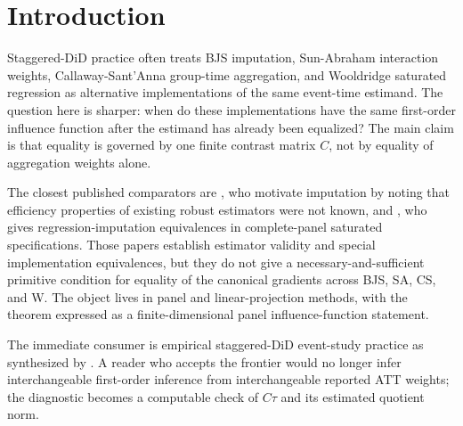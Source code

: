 \documentclass[11pt]{article}
\theoremstyle{definition}
\theoremstyle{plain}
\theoremstyle{remark}
\begin{document}
\section{Introduction}
Staggered-DiD practice often treats BJS imputation, Sun-Abraham interaction weights, Callaway-Sant'Anna group-time aggregation, and Wooldridge saturated regression as alternative implementations of the same event-time estimand. The question here is sharper: when do these implementations have the same first-order influence function after the estimand has already been equalized? The main claim is that equality is governed by one finite contrast matrix \(C\), not by equality of aggregation weights alone.

The closest published comparators are \citet[p.~949, Sec.~1]{borusyak_jaravel_spiess_2024_restud}, who motivate imputation by noting that efficiency properties of existing robust estimators were not known, and \citet[Sec.~3]{wooldridge_2023_ectj}, who gives regression-imputation equivalences in complete-panel saturated specifications. Those papers establish estimator validity and special implementation equivalences, but they do not give a necessary-and-sufficient primitive condition for equality of the canonical gradients across BJS, SA, CS, and W. The object lives in panel and linear-projection methods, with the theorem expressed as a finite-dimensional panel influence-function statement.

The immediate consumer is empirical staggered-DiD event-study practice as synthesized by \citet{roth_santanna_bilinski_poe_2023_joe}. A reader who accepts the frontier would no longer infer interchangeable first-order inference from interchangeable reported ATT weights; the diagnostic becomes a computable check of \(C\tau\) and its estimated quotient norm.
\end{document}
